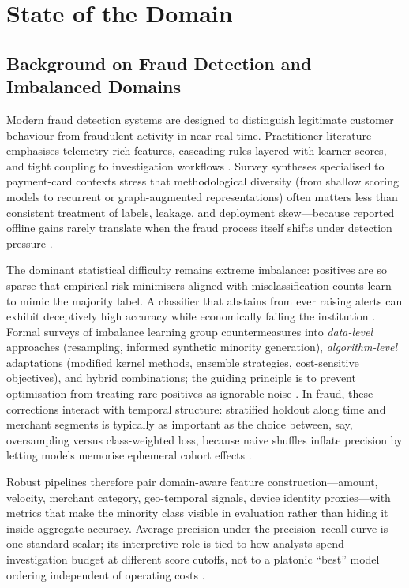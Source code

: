 \chapter{State of the Domain}

\section{Background on Fraud Detection and Imbalanced Domains}
Modern fraud detection systems are designed to distinguish legitimate customer behaviour from fraudulent activity in near real time. Practitioner literature emphasises telemetry-rich features, cascading rules layered with learner scores, and tight coupling to investigation workflows \cite{fraud_handbook}. Survey syntheses specialised to payment-card contexts stress that methodological diversity (from shallow scoring models to recurrent or graph-augmented representations) often matters less than consistent treatment of labels, leakage, and deployment skew—because reported offline gains rarely translate when the fraud process itself shifts under detection pressure \cite{lucas_jurgovsky_ccfraud_survey2020}.

The dominant statistical difficulty remains extreme imbalance: positives are so sparse that empirical risk minimisers aligned with misclassification counts learn to mimic the majority label. A classifier that abstains from ever raising alerts can exhibit deceptively high accuracy while economically failing the institution \cite{he_garcia_imbalanced2009,fraud_handbook}. Formal surveys of imbalance learning group countermeasures into \emph{data-level} approaches (resampling, informed synthetic minority generation), \emph{algorithm-level} adaptations (modified kernel methods, ensemble strategies, cost-sensitive objectives), and hybrid combinations; the guiding principle is to prevent optimisation from treating rare positives as ignorable noise \cite{he_garcia_imbalanced2009}. In fraud, these corrections interact with temporal structure: stratified holdout along time and merchant segments is typically as important as the choice between, say, oversampling versus class-weighted loss, because naive shuffles inflate precision by letting models memorise ephemeral cohort effects \cite{lucas_jurgovsky_ccfraud_survey2020,fraud_handbook}.

Robust pipelines therefore pair domain-aware feature construction—amount, velocity, merchant category, geo-temporal signals, device identity proxies—with metrics that make the minority class visible in evaluation rather than hiding it inside aggregate accuracy. Average precision under the precision--recall curve is one standard scalar; its interpretive role is tied to how analysts spend investigation budget at different score cutoffs, not to a platonic ``best'' model ordering independent of operating costs \cite{davis_goadrich_icml06,fraud_handbook}.

